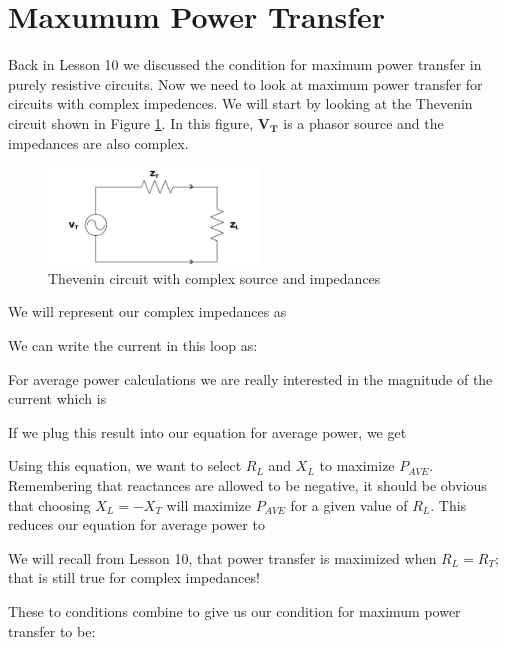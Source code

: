 \documentclass{handout}
\begin{document}
\section{Maxumum Power Transfer}
Back in Lesson 10 we discussed the condition for maximum power transfer in purely resistive circuits.  Now we need to look at maximum power transfer for circuits with complex impedences.  We will start by looking at the Thevenin circuit shown in Figure \ref{fig: Thevenin}.  In this figure, $\mathbf{V_T}$ is a phasor source and the impedances are also complex.
\begin{figure} [h!]
\centering
\includegraphics[width=0.5\textwidth]{Thevenin.jpg}
\caption{Thevenin circuit with complex source and impedances}
\label{fig: Thevenin}
\end{figure}

We will represent our complex impedances as
\soln{1in}{
\[
\mathbf{Z_T}=R_T+jX_T
\]
\[
\mathbf{Z_L}=R_L+jX_L
\]
}

We can write the current in this loop as:
\soln{2in}{
\[
\mathbf{I}=\frac{\mathbf{V_T}}{R_T+jX_T+R_L+jX_L}
\]
\[
\mathbf{I}=\frac{\mathbf{V_T}}{(R_T+R_L)+j(X_T+X_L)}
\]
}

For average power calculations we are really interested in the magnitude of the current which is
\soln{1in}{
\[
|\mathbf{I}| =\frac{|\mathbf{V_T}|}{\sqrt{(R_T+R_L)^2+(X_T+X_L)^2}}
\]
}

If we plug this result into our equation for average power, we get
\soln{2in}{
\[
P_{AVE} = \frac{R_L}{2}\frac{|\mathbf{V_T}|^2}{(R_T+R_L)^2+(X_T+X_L)^2}
\]
}

Using this equation, we want to select $R_L$ and $X_L$ to maximize $P_{AVE}$.  Remembering that reactances  are allowed to be negative, it should be obvious that choosing $X_L=-X_T$ will maximize $P_{AVE}$ for a given value of $R_L$.  This reduces our equation for average power to
\soln{2in}{
\[
P_{AVE} = \frac{R_L}{2}\frac{|\mathbf{V_T}|^2}{(R_T+R_L)^2}
\]
}

We will recall from Lesson 10, that power transfer is maximized when $R_L=R_T$; that is still true for complex impedances!  

These to conditions combine to give us our condition for maximum power transfer to be:
\end{document}
